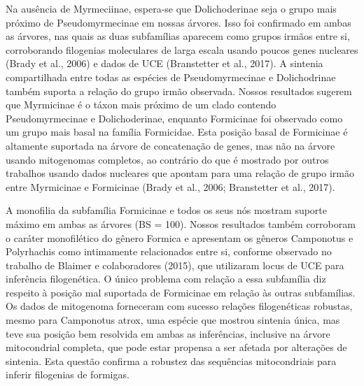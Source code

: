 \documentclass[../DISSERTACAO_MAIN.tex]{subfiles}
\begin{document}
	Na ausência de Myrmeciinae, espera-se que Dolichoderinae seja o grupo mais próximo de Pseudomyrmecinae em nossas árvores. Isso foi confirmado em ambas as árvores, nas quais as duas subfamílias aparecem como grupos irmãos entre si, corroborando filogenias moleculares de larga escala usando poucos genes nucleares (Brady et al., 2006) e dados de UCE (Branstetter et al., 2017). A sintenia compartilhada entre todas as espécies de Pseudomyrmecinae e Dolichodrinae também suporta a relação do grupo irmão observada. Nossos resultados sugerem que Myrmicinae é o táxon mais próximo de um clado contendo Pseudomyrmecinae e Dolichoderinae, enquanto Formicinae foi observado como um grupo mais basal na família Formicidae. Esta posição basal de Formicinae é altamente suportada na árvore de concatenação de genes, mas não na árvore usando mitogenomas completos, ao contrário do que é mostrado por outros trabalhos usando dados nucleares que apontam para uma relação de grupo irmão entre Myrmicinae e Formicinae (Brady et al., 2006; Branstetter et al., 2017).
	
	A monofilia da subfamília Formicinae e todos os seus nós mostram suporte máximo em ambas as árvores (BS = 100). Nossos resultados também corroboram o caráter monofilético do gênero Formica e apresentam os gêneros Camponotus e Polyrhachis como intimamente relacionados entre si, conforme observado no trabalho de Blaimer e colaboradores (2015), que utilizaram locus de UCE para inferência filogenética. O único problema com relação a essa subfamília diz respeito à posição mal suportada de Formicinae em relação às outras subfamílias. Os dados de mitogenoma forneceram com sucesso relações filogenéticas robustas, mesmo para Camponotus atrox, uma espécie que mostrou sintenia única, mas teve sua posição bem resolvida em ambas as inferências, inclusive na árvore mitocondrial completa, que pode estar propensa a ser afetada por alterações de sintenia. Esta questão confirma a robustez das sequências mitocondriais para inferir filogenias de formigas.
	
\end{document}
